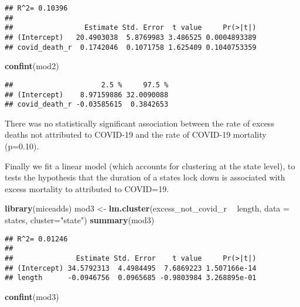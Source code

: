 \documentclass[
]{article}
\newenvironment{Shaded}{\begin{snugshade}}{\end{snugshade}}
\newcommand{\DataTypeTok}[1]{\textcolor[rgb]{0.13,0.29,0.53}{#1}}
\newcommand{\KeywordTok}[1]{\textcolor[rgb]{0.13,0.29,0.53}{\textbf{#1}}}
\newcommand{\NormalTok}[1]{#1}
\newcommand{\OperatorTok}[1]{\textcolor[rgb]{0.81,0.36,0.00}{\textbf{#1}}}
\newcommand{\StringTok}[1]{\textcolor[rgb]{0.31,0.60,0.02}{#1}}
\begin{document}
\begin{verbatim}
## R^2= 0.10396 
## 
##                 Estimate Std. Error  t value     Pr(>|t|)
## (Intercept)   20.4903038  5.8769983 3.486525 0.0004893389
## covid_death_r  0.1742046  0.1071758 1.625409 0.1040753359
\end{verbatim}

\begin{Shaded}
\begin{Highlighting}[]
\KeywordTok{confint}\NormalTok{(mod2) }
\end{Highlighting}
\end{Shaded}

\begin{verbatim}
##                     2.5 %     97.5 %
## (Intercept)    8.97159886 32.0090088
## covid_death_r -0.03585615  0.3842653
\end{verbatim}

There was no statistically significant association between the rate of
excess deaths not attributed to COVID-19 and the rate of COVID-19
mortality (p=0.10).

Finally we fit a linear model (which accounts for clustering at the
state level), to tests the hypothesis that the duration of a states lock
down is associated with excess mortality to attributed to COVID=19.

\begin{Shaded}
\begin{Highlighting}[]
\KeywordTok{library}\NormalTok{(miceadds)}
\NormalTok{mod3 <-}\StringTok{ }\KeywordTok{lm.cluster}\NormalTok{(excess_not_covid_r }\OperatorTok{~}\StringTok{ }\NormalTok{length, }\DataTypeTok{data =}\NormalTok{ states, }\DataTypeTok{cluster=}\StringTok{"state"}\NormalTok{)}
\KeywordTok{summary}\NormalTok{(mod3)}
\end{Highlighting}
\end{Shaded}

\begin{verbatim}
## R^2= 0.01246 
## 
##               Estimate Std. Error    t value     Pr(>|t|)
## (Intercept) 34.5792313  4.4984495  7.6869223 1.507166e-14
## length      -0.0946756  0.0965685 -0.9803984 3.268895e-01
\end{verbatim}

\begin{Shaded}
\begin{Highlighting}[]
\KeywordTok{confint}\NormalTok{(mod3) }
\end{Highlighting}
\end{Shaded}
\end{document}
